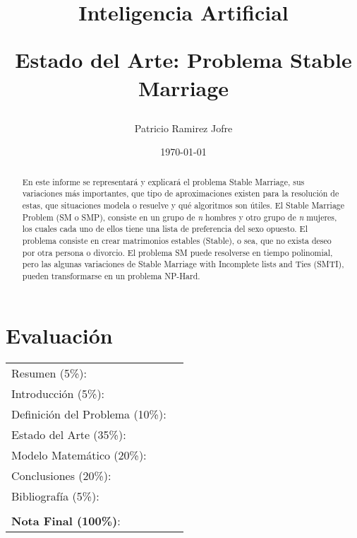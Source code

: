\documentclass[letter, 10pt]{article}
\begin{document}
\title{Inteligencia Artificial \\ \begin{Large}Estado del Arte: Problema Stable Marriage\end{Large}}
\author{Patricio Ramirez Jofre}
\date{\today}
\maketitle


\section*{Evaluaci\'on}

\begin{tabular}{ll}
Resumen (5\%): & \underline{\hspace{2cm}} \\
Introducci\'on (5\%):  & \underline{\hspace{2cm}} \\
Definici\'on del Problema (10\%):  & \underline{\hspace{2cm}} \\
Estado del Arte (35\%):  & \underline{\hspace{2cm}} \\
Modelo Matem\'atico (20\%): &  \underline{\hspace{2cm}}\\
Conclusiones (20\%): &  \underline{\hspace{2cm}}\\
Bibliograf\'ia (5\%): & \underline{\hspace{2cm}}\\
 &  \\
\textbf{Nota Final (100\%)}:   & \underline{\hspace{2cm}}
\end{tabular}
\vspace{2cm}


\begin{abstract}
En este informe se representar\'a y explicar\'a el problema Stable Marriage, sus variaciones m\'as 
importantes, que tipo de aproximaciones existen para la resoluci\'on de estas, que situaciones modela o 
resuelve y qu\'e algoritmos son \'utiles. El Stable Marriage Problem (SM o SMP), consiste en un grupo de 
\textit{n} hombres y otro grupo de \textit{n} mujeres, los cuales cada uno de ellos tiene una lista de 
preferencia del sexo opuesto.	El problema consiste en crear matrimonios estables (Stable), o sea, que 
no exista deseo por otra persona o divorcio.	El problema SM puede resolverse en tiempo polinomial, 
pero las algunas variaciones de Stable Marriage with Incomplete lists and Ties (SMTI), pueden transformarse
en un problema NP-Hard. 
\end{abstract}
\end{document}
